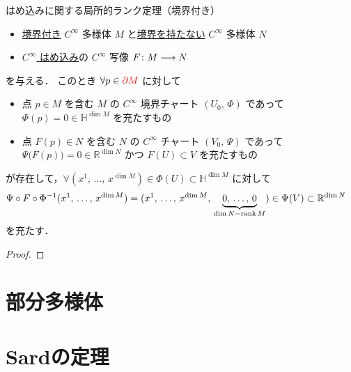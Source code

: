 \documentclass[TQFT_main]{subfiles}
\begin{document}
\begin{mytheo}[label=thm:rank-b]{はめ込みに関する局所的ランク定理（境界付き）}
    \begin{itemize}
        \item \underline{境界付き} $C^\infty$ 多様体 $M$ と\underline{境界を持たない} $C^\infty$ 多様体 $N$
        \item \hyperref[def:submersion-smooth]{$C^\infty$ はめ込み}の $C^\infty$ 写像 $F \colon M \longrightarrow N$
    \end{itemize}
    を与える．
    このとき $\forall p \in \textcolor{red}{\partial M}$ に対して
    \begin{itemize}
        \item 点 $p \in M$ を含む $M$ の $C^\infty$ 境界チャート $(U_0,\, \Phi)$ であって $\Phi(p) = 0 \in \mathbb{H}^{\dim M}$ を充たすもの
        \item 点 $F(p) \in N$ を含む $N$ の $C^\infty$ チャート $(V_0,\, \Psi)$ であって $\Psi \bigl( F(p) \bigr) = 0 \in \mathbb{R}^{\dim N}$ かつ $F(U) \subset V$ を充たすもの
    \end{itemize}
    が存在して，$\forall (x^1,\, \dots,\, x^{\dim M}) \in \Phi(U) \subset \mathbb{H}^{\dim M}$ に対して
    \begin{align}
        \label{eq:coord-rep-canonical-b}
        \Psi \circ F \circ \Phi^{-1} &(x^1,\, \dots,\, x^{\dim M}) = (x^1,\, \dots,\, x^{\dim M},\, \underbrace{0,\, \dots,\, 0}_{\dim N - \rank M}) \in \Psi(V) \subset \mathbb{R}^{\dim N}
    \end{align}
    を充たす．
\end{mytheo}

\begin{proof}
    
\end{proof}



\section{部分多様体}
\section{Sardの定理}
\end{document}
